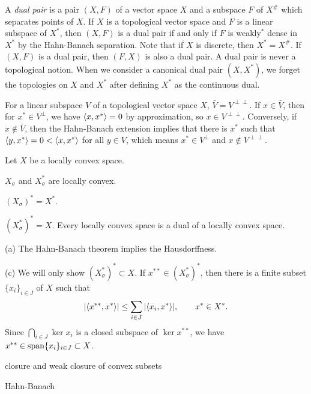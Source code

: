 \documentclass{../../large}
\begin{document}
\begin{prb}
A \emph{dual pair} is a pair $(X,F)$ of a vector space $X$ and a subspace $F$ of $X^\#$ which separates points of $X$.
If $X$ is a topological vector space and $F$ is a linear subspace of $X^*$, then $(X,F)$ is a dual pair if and only if $F$ is weakly$^*$ dense in $X^*$ by the Hahn-Banach separation.
Note that if $X$ is discrete, then $X^*=X^\#$.
If $(X,F)$ is a dual pair, then $(F,X)$ is also a dual pair.
A dual pair is never a topological notion.
When we consider a canonical dual pair $(X,X^*)$, we forget the topologies on $X$ and $X^*$ after defining $X^*$ as the continuous dual.

\end{prb}

\begin{pf}
For a linear subspace $V$ of a topological vector space $X$, $\bar V=V^{\perp\perp}$.
If $x\in\bar V$, then for $x^*\in V^\perp$, we have $\langle x,x^*\rangle=0$ by approximation, so $x\in V^{\perp\perp}$.
Conversely, if $x\notin\bar V$, then the Hahn-Banach extension implies that there is $x^*$ such that $\langle y,x^*\rangle=0<\langle x,x^*\rangle$ for all $y\in V$, which means $x^*\in V^\perp$ and $x\notin V^{\perp\perp}$.

\end{pf}

\begin{prb}
Let $X$ be a locally convex space.
\begin{parts}
\item $X_\sigma$ and $X^*_\sigma$ are locally convex.
\item $(X_\sigma)^*=X^*$.
\item $(X^*_\sigma)^*=X$. Every locally convex space is a dual of a locally convex space.
\end{parts}
\end{prb}
\begin{pf}
(a)
The Hahn-Banach theorem implies the Hausdorffness.

(c)
We will only show $(X^*_\sigma)^*\subset X$.
If $x^{**}\in(X^*_\sigma)^*$, then there is a finite subset $\{x_i\}_{i\in J}$ of $X$ such that
\[|\langle x^{**},x^*\rangle|\le\sum_{i\in J}|\langle x_i,x^*\rangle|,\qquad x^*\in X^*.\]
Since $\bigcap_{i\in J}\ker x_i$ is a closed subspace of $\ker x^{**}$, we have $x^{**}\in\operatorname{span}\{x_i\}_{i\in J}\subset X$.
\end{pf}

\begin{prb}
closure and weak closure of convex subsets
\end{prb}
\begin{pf}
Hahn-Banach
\end{pf}
\end{document}
